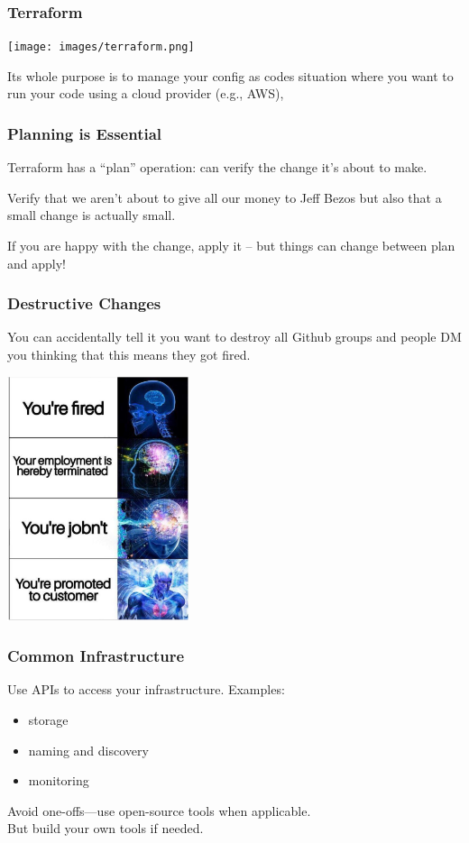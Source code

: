 \begin{frame}
\frametitle{Terraform}

\begin{center}
	\texttt{[image: images/terraform.png]}
\end{center}

Its whole purpose is to manage your config as codes
situation where you want to run your code using a cloud provider (e.g., AWS), 

\end{frame}


\begin{frame}
\frametitle{Planning is Essential}

Terraform has a ``plan'' operation: can verify the change it's about to make. 

Verify that we aren't about to give all our money to Jeff Bezos but also that a small change is actually small.

If you are happy with the change, apply it -- but things can change between plan and apply!

\end{frame}


\begin{frame}
\frametitle{Destructive Changes}

You can accidentally tell it you want to destroy all Github groups and people DM you thinking that this means they got fired.

\begin{center}
	\includegraphics[width=0.4\textwidth]{images/fired.jpg}
\end{center}

\end{frame}

\begin{frame}
\frametitle{Common Infrastructure}

\large

Use APIs to access your infrastructure. Examples:

\begin{itemize}
\item storage
\item naming and discovery
\item monitoring
\end{itemize}

Avoid one-offs---use open-source tools when applicable.\\
But build your own tools if needed.


\end{frame}

